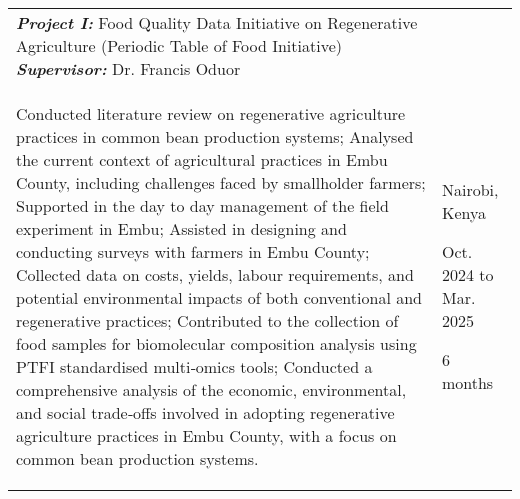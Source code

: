\documentclass[10pt, letterpaper]{sulmancv}
\begin{document}
        \begin{tabularx}{
             cm-0.13cm
        }{
            K{0.2 cm}
            R{3.5 cm}
        }

            \textbf{\textit{Project I:}} Food Quality Data Initiative on Regenerative Agriculture (Periodic Table of Food Initiative)
            \hspace{2 cm}
            \textbf{\textit{Supervisor:}} Dr. Francis Oduor\\
            
            \vspace{0.01 cm}
            \begin{myenumerate}
                \item[\textcolor{primaryColor}{\faCheckCircle[regular]}] Conducted literature review on regenerative agriculture practices in common bean production systems; Analysed the current context of agricultural practices in Embu County, including challenges faced by smallholder farmers; Supported in the day to day management of the field experiment in Embu; Assisted in designing and conducting surveys with farmers in Embu County; Collected data on costs, yields, labour requirements, and potential environmental impacts of both conventional and regenerative practices; Contributed to the collection of food samples for biomolecular composition analysis using PTFI standardised multi‐omics tools; Conducted a comprehensive analysis of the economic, environmental, and social trade‐offs involved in adopting regenerative agriculture practices in Embu County, with a focus on common bean production systems.
                \end{myenumerate}
            &
            Nairobi, Kenya
            
            Oct. 2024 to Mar. 2025
            
            6 months
        \end{tabularx}

        \vspace{0.2 cm}
        
\end{document}
